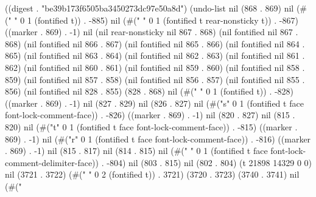 
((digest . "be39b173f6505ba3450273dc97e50a8d") (undo-list nil (868 . 869) nil (#("
" 0 1 (fontified t)) . -885) nil (#("
" 0 1 (fontified t rear-nonsticky t)) . -867) ((marker . 869) . -1) nil (nil rear-nonsticky nil 867 . 868) (nil fontified nil 867 . 868) (nil fontified nil 866 . 867) (nil fontified nil 865 . 866) (nil fontified nil 864 . 865) (nil fontified nil 863 . 864) (nil fontified nil 862 . 863) (nil fontified nil 861 . 862) (nil fontified nil 860 . 861) (nil fontified nil 859 . 860) (nil fontified nil 858 . 859) (nil fontified nil 857 . 858) (nil fontified nil 856 . 857) (nil fontified nil 855 . 856) (nil fontified nil 828 . 855) (828 . 868) nil (#("
" 0 1 (fontified t)) . -828) ((marker . 869) . -1) nil (827 . 829) nil (826 . 827) nil (#("s" 0 1 (fontified t face font-lock-comment-face)) . -826) ((marker . 869) . -1) nil (820 . 827) nil (815 . 820) nil (#("t" 0 1 (fontified t face font-lock-comment-face)) . -815) ((marker . 869) . -1) nil (#("r" 0 1 (fontified t face font-lock-comment-face)) . -816) ((marker . 869) . -1) nil (815 . 817) nil (814 . 815) nil (#(" " 0 1 (fontified t face font-lock-comment-delimiter-face)) . -804) nil (803 . 815) nil (802 . 804) (t 21898 14329 0 0) nil (3721 . 3722) (#("  " 0 2 (fontified t)) . 3721) (3720 . 3723) (3740 . 3741) nil (#("
